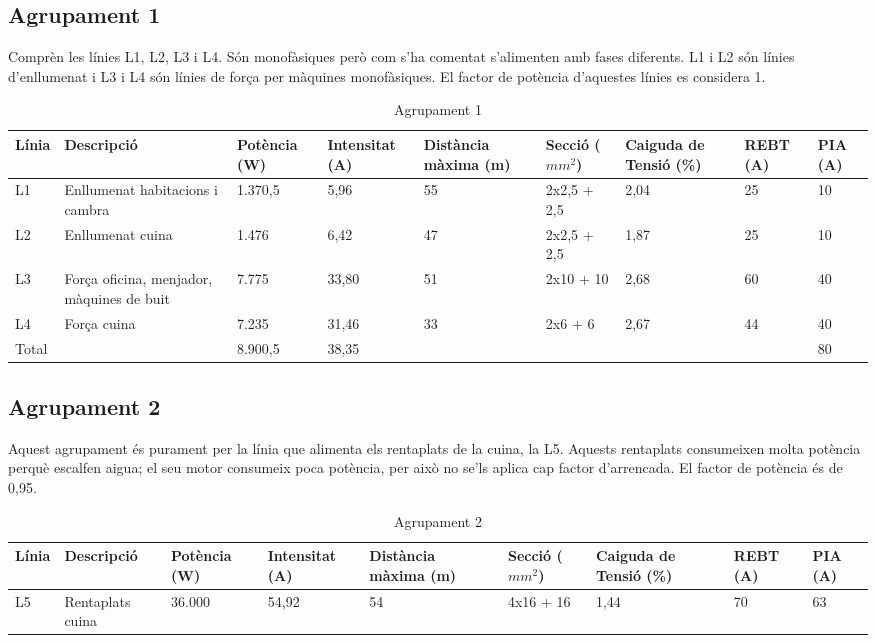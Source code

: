 \subsection{Agrupament 1}
Comprèn les línies L1, L2, L3 i L4. Són monofàsiques però com s'ha comentat s'alimenten amb fases diferents. L1 i L2 són línies d'enllumenat i L3 i L4 són línies de força per màquines monofàsiques. El factor de potència d'aquestes línies es considera 1.
%
\begin{table}[H]
\small
\begin{center}
 \begin{tabu} to \textwidth {|X[0.5, l]|X[2, l]|X[r]|X[r]|X[r]|X[r]|X[r]|X[r]|X[0.5,r]|}%
 \hline
 Línia& Descripció & Potència (W) & Intensitat (A) & Distància màxima (m) & Secció ($mm^{2}$) & Caiguda de Tensió (\%) & REBT (A)& PIA (A)\\
 \hline \hline 
L1 & Enllumenat habitacions i cambra& 1.370,5 & 5,96 & 55 &2x2,5 + 2,5& 2,04 & 25 & 10 \\ \hline
L2 & Enllumenat cuina & 1.476 \ \ \ \  & 6,42 & 47 &2x2,5 + 2,5& 1,87 & 25 & 10 \\ \hline 
L3 & Força oficina, menjador, màquines de buit & 7.775 \ \ \ \  & 33,80 & 51 &2x10 + 10& 2,68 & 60 & 40 \\ \hline 
L4 & Força cuina & 7.235 \ \ \ \  & 31,46 & 33 &2x6 + 6& 2,67 & 44 & 40 \\ \hline 
 \hline
 Total & & 8.900,5 & 38,35 & & & & & 80 \\
 \hline
 \end{tabu}
 \caption{Agrupament 1}
\end{center}
\end{table}


\subsection{Agrupament 2}
Aquest agrupament és purament per la línia que alimenta els rentaplats de la cuina, la L5. Aquests rentaplats consumeixen molta potència perquè escalfen aigua; el seu motor consumeix poca potència, per això no se'ls aplica cap factor d'arrencada. El factor de potència és de 0,95. 
\begin{table}[H]
\small
\begin{center}
 \begin{tabu} to \textwidth {|X[0.5, l]|X[2, l]|X[r]|X[r]|X[r]|X[r]|X[r]|X[r]|X[0.5,r]|}%
 \hline
 Línia& Descripció & Potència (W) & Intensitat (A) & Distància màxima (m) & Secció ($mm^{2}$) & Caiguda de Tensió (\%) & REBT (A)& PIA (A)\\
 \hline \hline 
L5 & Rentaplats cuina & 36.000 & 54,92 & 54 &4x16 + 16& 1,44 & 70 & 63 \\
 \hline
 \end{tabu}
 \caption{Agrupament 2}
\end{center}
\end{table}

